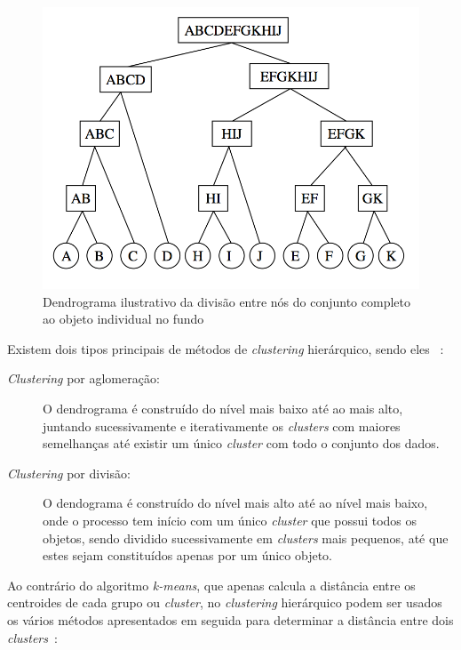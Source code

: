 \begin{figure}[h]
\centering
\includegraphics[width=0.6\linewidth]{./figures/hierarquico}
\caption{Dendrograma ilustrativo da divisão entre nós do conjunto completo ao objeto individual no fundo~\citet{Bramer2007}}
\label{fig:hierarquico}
\end{figure}

Existem dois tipos principais de métodos de \textit{clustering} hierárquico, sendo eles~\citet{Liu2011} :

\begin{description}
\item[\textit{Clustering} por aglomeração:] O dendrograma é construído do nível mais baixo até ao mais alto, juntando sucessivamente e iterativamente os \textit{clusters} com maiores semelhanças até existir um único \textit{cluster} com todo o conjunto dos dados.

\item[\textit{Clustering} por divisão:] O dendograma é construído do nível mais alto até ao nível mais baixo, onde o processo tem início com um único \textit{cluster} que possui todos os objetos, sendo dividido sucessivamente em \textit{clusters} mais pequenos, até que estes sejam constituídos apenas por um único objeto.
\end{description}

Ao contrário do algoritmo \textit{k-means}, que apenas calcula a distância entre os centroides de cada grupo ou \textit{cluster}, no \textit{clustering} hierárquico podem ser usados os vários métodos apresentados em seguida para determinar a distância entre dois \textit{clusters}~\citet{Liu2011}: 

